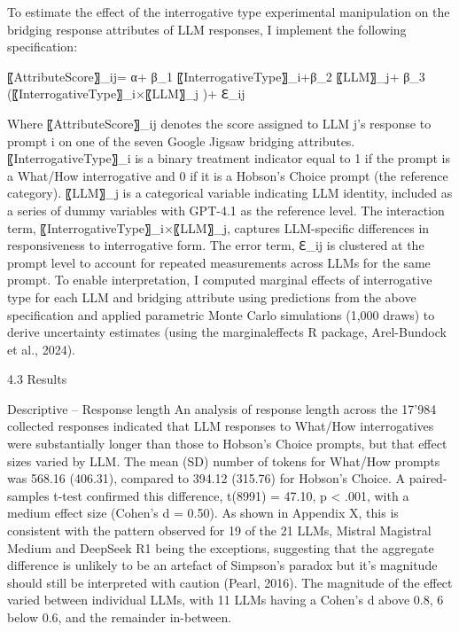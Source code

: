 \documentclass[
  12pt,
]{article}
\begin{document}
To estimate the effect of the interrogative type experimental manipulation on the bridging response attributes of LLM responses, I implement the following specification:

〖AttributeScore〗\_ij= α+ β\_1 〖InterrogativeType〗\_i+β\_2 〖LLM〗\_j+ β\_3 (〖InterrogativeType〗\_i×〖LLM〗\_j )+ ℇ\_ij

Where 〖AttributeScore〗\_ij denotes the score assigned to LLM j's response to prompt i on one of the seven Google Jigsaw bridging attributes. 〖InterrogativeType〗\_i is a binary treatment indicator equal to 1 if the prompt is a What/How interrogative and 0 if it is a Hobson's Choice prompt (the reference category). 〖LLM〗\_j is a categorical variable indicating LLM identity, included as a series of dummy variables with GPT-4.1 as the reference level. The interaction term, 〖InterrogativeType〗\_i×〖LLM〗\_j, captures LLM-specific differences in responsiveness to interrogative form. The error term, ℇ\_ij is clustered at the prompt level to account for repeated measurements across LLMs for the same prompt. To enable interpretation, I computed marginal effects of interrogative type for each LLM and bridging attribute using predictions from the above specification and applied parametric Monte Carlo simulations (1,000 draws) to derive uncertainty estimates (using the marginaleffects R package, Arel-Bundock et al., 2024).

4.3 Results

Descriptive -- Response length
An analysis of response length across the 17'984 collected responses indicated that LLM responses to What/How interrogatives were substantially longer than those to Hobson's Choice prompts, but that effect sizes varied by LLM. The mean (SD) number of tokens for What/How prompts was 568.16 (406.31), compared to 394.12 (315.76) for Hobson's Choice. A paired-samples t-test confirmed this difference, t(8991) = 47.10, p \textless{} .001, with a medium effect size (Cohen's d = 0.50). As shown in Appendix X, this is consistent with the pattern observed for 19 of the 21 LLMs, Mistral Magistral Medium and DeepSeek R1 being the exceptions, suggesting that the aggregate difference is unlikely to be an artefact of Simpson's paradox but it's magnitude should still be interpreted with caution (Pearl, 2016). The magnitude of the effect varied between individual LLMs, with 11 LLMs having a Cohen's d above 0.8, 6 below 0.6, and the remainder in-between.
\end{document}
